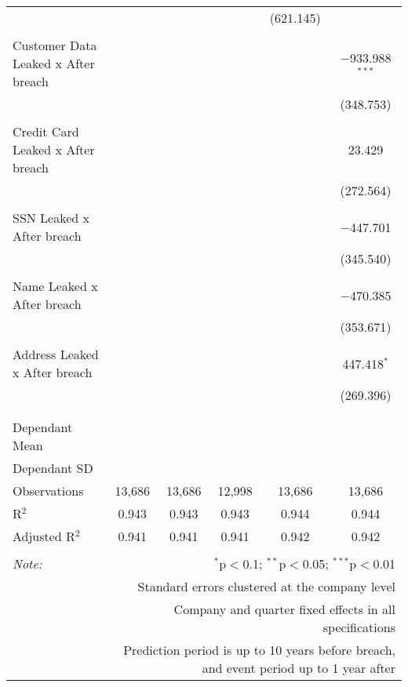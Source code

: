 \begin{table}[!htbp]
\begin{tabular}{@{\extracolsep{5pt}}lccccc}
  &  &  &  & (621.145) &  \\ 
  & & & & & \\ 
 Customer Data Leaked x After breach &  &  &  &  & $-$933.988$^{***}$ \\ 
  &  &  &  &  & (348.753) \\ 
  & & & & & \\ 
 Credit Card Leaked x After breach &  &  &  &  & 23.429 \\ 
  &  &  &  &  & (272.564) \\ 
  & & & & & \\ 
 SSN Leaked x After breach &  &  &  &  & $-$447.701 \\ 
  &  &  &  &  & (345.540) \\ 
  & & & & & \\ 
 Name Leaked x After breach &  &  &  &  & $-$470.385 \\ 
  &  &  &  &  & (353.671) \\ 
  & & & & & \\ 
 Address Leaked x After breach &  &  &  &  & 447.418$^{*}$ \\ 
  &  &  &  &  & (269.396) \\ 
  & & & & & \\ 
\hline \\[-1.8ex] 
Dependant Mean &  &  &  &  &  \\ 
Dependant SD &  &  &  &  &  \\ 
Observations & 13,686 & 13,686 & 12,998 & 13,686 & 13,686 \\ 
R$^{2}$ & 0.943 & 0.943 & 0.943 & 0.944 & 0.944 \\ 
Adjusted R$^{2}$ & 0.941 & 0.941 & 0.941 & 0.942 & 0.942 \\ 
\hline 
\hline \\[-1.8ex] 
\textit{Note:}  & \multicolumn{5}{r}{$^{*}$p$<$0.1; $^{**}$p$<$0.05; $^{***}$p$<$0.01} \\ 
 & \multicolumn{5}{r}{Standard errors clustered at the company level} \\ 
 & \multicolumn{5}{r}{Company and quarter fixed effects in all specifications} \\ 
 & \multicolumn{5}{r}{Prediction period is up to 10 years before breach, and event period up to 1 year after} \\ 
\end{tabular} 
\end{table} 
